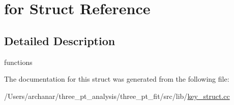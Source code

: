 \hypertarget{structfor}{}\section{for Struct Reference}
\label{structfor}


\subsection{Detailed Description}
functions 

The documentation for this struct was generated from the following file\+:\begin{DoxyCompactItemize}
\item 
/\+Users/archanar/three\+\_\+pt\+\_\+analysis/three\+\_\+pt\+\_\+fit/src/lib/\mbox{\hyperlink{key__struct_8cc}{key\+\_\+struct.\+cc}}\end{DoxyCompactItemize}
